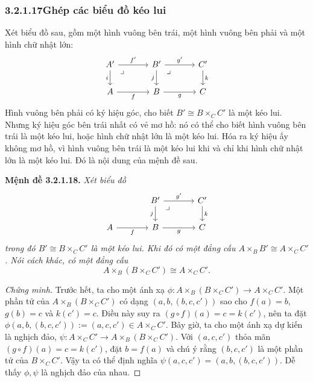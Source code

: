\subsubsection*{3.2.1.17\quad Ghép các biểu đồ kéo lui}
Xét biểu đồ sau, gồm một hình vuông bên trái, một hình vuông bên phải và một hình chữ nhật lớn:
\[\begin{tikzcd}[column sep=large]
A'\arrow[r,"f'"]\arrow[d,"i"']\arrow[dr,phantom,"\lrcorner",very near start]&B'\arrow[r,"g'"]\arrow[d,"j"']\arrow[dr,phantom,"\lrcorner",very near start]&C'\arrow[d,"k"]\\
A\arrow[r,"f"']&B\arrow[r,"g"']&C
\end{tikzcd}\]
Hình vuông bên phải có ký hiệu góc, cho biết $B'\cong B\times_CC'$ là một kéo lui. Nhưng ký hiệu góc bên trái nhất có vẻ mơ hồ: nó có thể cho biết hình vuông bên trái là một kéo lui, hoặc hình chữ nhật lớn là một kéo lui. Hóa ra ký hiệu ấy không mơ hồ, vì hình vuông bên trái là một kéo lui khi và chỉ khi hình chữ nhật lớn là một kéo lui. Đó là nội dung của mệnh đề sau.

\noindent\textbf{Mệnh đề 3.2.1.18.} \emph{Xét biểu đồ}
\[\begin{tikzcd}[column sep=large]
&B'\arrow[r,"g'"]\arrow[d,"j"']\arrow[dr,phantom,"\lrcorner",very near start]&C'\arrow[d,"k"]\\
A\arrow[r,"f"']&B\arrow[r,"g"']&C
\end{tikzcd}\]
\emph{trong đó $B'\cong B\times_CC'$ là một kéo lui. Khi đó có một đẳng cấu $A\times_BB'\cong A\times_CC'$. Nói cách khác, có một đẳng cấu}
\[A\times_B(B\times_CC')\cong A\times_CC'.\]

\begin{proof}[Chứng minh]
Trước hết, ta cho một ánh xạ $\phi:A\times_B(B\times_CC')\to A\times_CC'$. Một phần tử của $A\times_B(B\times_CC')$ có dạng $(a,b,(b,c,c'))$ sao cho $f(a)=b$, $g(b)=c$ và $k(c')=c$. Điều này suy ra $(g\circ f)(a)=c=k(c')$, nên ta đặt $\phi(a,b,(b,c,c')):=(a,c,c')\in A\times_CC'$. Bây giờ, ta cho một ánh xạ dự kiến là nghịch đảo, $\psi:A\times_CC'\to A\times_B(B\times_CC')$. Với $(a,c,c')$ thỏa mãn $(g\circ f)(a)=c=k(c')$, đặt $b=f(a)$ và chú ý rằng $(b,c,c')$ là một phần tử của $B\times_CC'$. Vậy ta có thể định nghĩa $\psi(a,c,c')=(a,b,(b,c,c'))$. Dễ thấy $\phi,\psi$ là nghịch đảo của nhau.
\end{proof}
